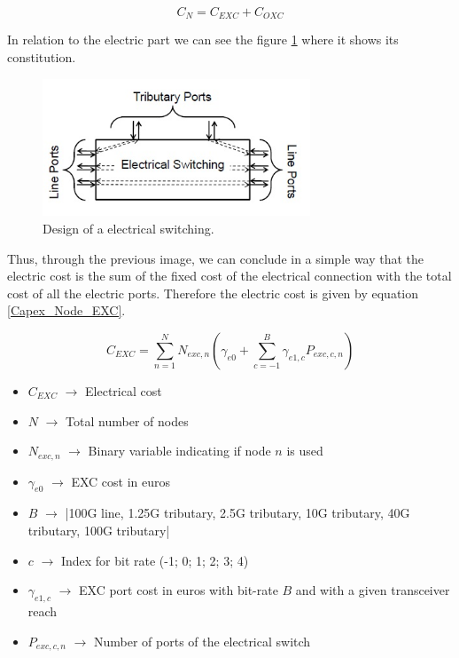 \begin{equation}
C_N = C_{EXC} + C_{OXC}
\label{Capex_Node}
\end{equation}

\vspace{11pt}
In relation to the electric part we can see the figure \ref{exc_design} where it shows its constitution.

\begin{figure}[h!]
\centering
\includegraphics[width=8cm]{sdf/ILP/figures/exc_design}
\caption{Design of a electrical switching.}
\label{exc_design}
\end{figure}


Thus, through the previous image, we can conclude in a simple way that the electric cost is the sum of the fixed cost of the electrical connection with the total cost of all the electric ports.
Therefore the electric cost is given by equation \ref{Capex_Node_EXC}.

\begin{equation}
C_{EXC} = \sum_{n=1}^{N} N_{exc,n} \left( \gamma_{e0} + \sum_{c=-1}^B \gamma_{e1,c} P_{exc,c,n} \right)
\label{Capex_Node_EXC}
\end{equation}

\begin{itemize}
\item{$C_{EXC}$			$\rightarrow$	Electrical cost}
\item{$N$				$\rightarrow$	Total number of nodes}
\item{$N_{exc,n}$		$\rightarrow$	Binary variable indicating if node $n$ is used}
\item{$\gamma_{e0}$ 	$\rightarrow$	EXC cost in euros}
\item{$B$           	$\rightarrow$	|100G line, 1.25G tributary, 2.5G tributary, 10G tributary, 40G tributary, 100G tributary|}
\item{$c$               $\rightarrow$   Index for bit rate (-1; 0; 1; 2; 3; 4)}
\item{$\gamma_{e1,c}$	$\rightarrow$	EXC port cost in euros with bit-rate $B$ and with a given transceiver reach}
\item{$P_{exc,c,n}$	    $\rightarrow$	Number of ports of the electrical switch}
\end{itemize}

